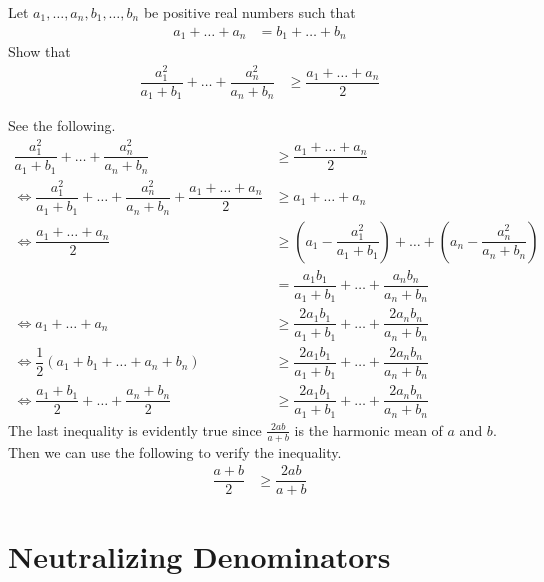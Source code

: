 \documentclass[inequalities.tex]{subfile}
\begin{document}
		\begin{problem}
			Let $a_{1},\ldots,a_{n},b_{1},\ldots,b_{n}$ be positive real numbers such that
				\begin{align*}
					a_{1}+\ldots+a_{n}
						& = b_{1}+\ldots+b_{n}
				\end{align*}
			Show that
				\begin{align*}
					\dfrac{a_{1}^{2}}{a_{1}+b_{1}}+\ldots+\dfrac{a_{n}^{2}}{a_{n}+b_{n}}
						& \geq\dfrac{a_{1}+\ldots+a_{n}}{2}
				\end{align*}

				\begin{solution}
					See the following.
						\begin{align*}
							\dfrac{a_{1}^{2}}{a_{1}+b_{1}}+\ldots+\dfrac{a_{n}^{2}}{a_{n}+b_{n}}
								& \geq\dfrac{a_{1}+\ldots+a_{n}}{2}\\
							\iff \dfrac{a_{1}^{2}}{a_{1}+b_{1}}+\ldots+\dfrac{a_{n}^{2}}{a_{n}+b_{n}}+\dfrac{a_{1}+\ldots+a_{n}}{2}
								& \geq a_{1}+\ldots+a_{n}\\
							\iff \dfrac{a_{1}+\ldots+a_{n}}{2}
								& \geq \left(a_{1}-\dfrac{a_{1}^{2}}{a_{1}+b_{1}}\right)+\ldots+\left(a_{n}-\dfrac{a_{n}^{2}}{a_{n}+b_{n}}\right)\\
								& = \dfrac{a_{1}b_{1}}{a_{1}+b_{1}}+\ldots+\dfrac{a_{n}b_{n}}{a_{n}+b_{n}}\\
							\iff a_{1}+\ldots+a_{n}
								& \geq \dfrac{2a_{1}b_{1}}{a_{1}+b_{1}}+\ldots+\dfrac{2a_{n}b_{n}}{a_{n}+b_{n}}\\
							\iff \dfrac{1}{2}(a_{1}+b_{1}+\ldots+a_{n}+b_{n})
								& \geq \dfrac{2a_{1}b_{1}}{a_{1}+b_{1}}+\ldots+\dfrac{2a_{n}b_{n}}{a_{n}+b_{n}}\\
							\iff \dfrac{a_{1}+b_{1}}{2}+\ldots+\dfrac{a_{n}+b_{n}}{2}
								& \geq \dfrac{2a_{1}b_{1}}{a_{1}+b_{1}}+\ldots+\dfrac{2a_{n}b_{n}}{a_{n}+b_{n}}
						\end{align*}
					The last inequality is evidently true since $\frac{2ab}{a+b}$ is the harmonic mean of $a$ and $b$. Then we can use the following to verify the inequality.
						\begin{align*}
							\dfrac{a+b}{2}
								& \geq \dfrac{2ab}{a+b}
						\end{align*}
				\end{solution}
		\end{problem}
	\section{Neutralizing Denominators}
\end{document}
